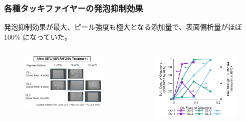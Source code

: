 \documentclass[unicode,12pt]{beamer}%
\begin{document}
	
\begin{frame}\frametitle{各種タッキファイヤーの発泡抑制効果}

\large
発泡抑制効果が最大、ピール強度も極大となる添加量で、表面偏析量がほぼ 100\% になっていた。

\begin{columns}
\begin{column}{6 cm}
	\begin{figure}[htbp]
		\begin{center}
			\includegraphics[width=60mm]{tennka_hapou_BW.png}
		\end{center}
	\end{figure}
\end{column}
\begin{column}{6cm}
	\begin{figure}[htbp]
		\begin{center}
			\hspace{10pt}
			\includegraphics[width=60mm]{Exp_Data_color.png}
		\end{center}
\end{figure}

\end{column}
\end{columns}

\end{frame}
\end{document}

